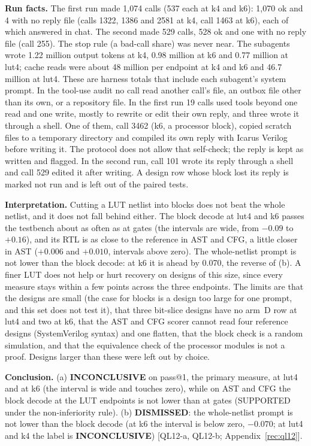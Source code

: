 \documentclass[conference]{IEEEtran}
\newcommand{\verdict}[1]{\textbf{\textsc{#1}}}
\newcommand{\hev}[1]{\par\smallskip\noindent\textbf{#1}}
\begin{document}
\hev{Run facts.} The first run made 1,074 calls (537 each at k4 and k6): 1,070 ok and 4 with no reply file (calls 1322, 1386 and 2581 at k4, call 1463 at k6), each of which answered in chat. The second made 529 calls, 528 ok and one with no reply file (call 255). The stop rule (a bad-call share) was never near. The subagents wrote 1.22 million output tokens at k4, 0.98 million at k6 and 0.77 million at lut4; cache reads were about 48 million per endpoint at k4 and k6 and 46.7 million at lut4. These are harness totals that include each subagent's system prompt. In the tool-use audit no call read another call's file, an outbox file other than its own, or a repository file. In the first run 19 calls used tools beyond one read and one write, mostly to rewrite or edit their own reply, and three wrote it through a shell. One of them, call 3462 (k6, a processor block), copied scratch files to a temporary directory and compiled its own reply with Icarus Verilog before writing it. The protocol does not allow that self-check; the reply is kept as written and flagged. In the second run, call 101 wrote its reply through a shell and call 529 edited it after writing. A design row whose block lost its reply is marked not run and is left out of the paired tests.

\hev{Interpretation.} Cutting a LUT netlist into blocks does not beat the whole netlist, and it does not fall behind either. The block decode at lut4 and k6 passes the testbench about as often as at gates (the intervals are wide, from $-0.09$ to $+0.16$), and its RTL is as close to the reference in AST and CFG, a little closer in AST ($+0.006$ and $+0.010$, intervals above zero). The whole-netlist prompt is not lower than the block decode: at k6 it is ahead by 0.070, the reverse of (b). A finer LUT does not help or hurt recovery on designs of this size, since every measure stays within a few points across the three endpoints. The limits are that the designs are small (the case for blocks is a design too large for one prompt, and this set does not test it), that three bit-slice designs have no arm~D row at lut4 and two at k6, that the AST and CFG scorer cannot read four reference designs (SystemVerilog syntax) and one flatten, that the block check is a random simulation, and that the equivalence check of the processor modules is not a proof. Designs larger than these were left out by choice.

\hev{Conclusion.} (a) \verdict{INCONCLUSIVE} on pass@1, the primary measure, at lut4 and at k6 (the interval is wide and touches zero), while on AST and CFG the block decode at the LUT endpoints is not lower than at gates (SUPPORTED under the non-inferiority rule). (b) \verdict{DISMISSED}: the whole-netlist prompt is not lower than the block decode (at k6 the interval is below zero, $-0.070$; at lut4 and k4 the label is \verdict{INCONCLUSIVE}) [QL12-a, QL12-b; Appendix~\ref{rec:ql12}].
\end{document}
